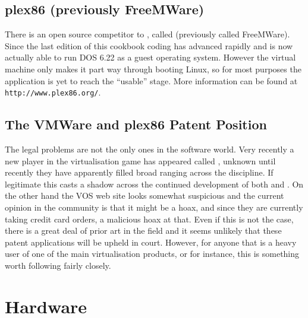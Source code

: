 \documentclass[twoside,11pt]{starlink}
\begin{document}
\subsection{plex86 (previously
FreeMWare)\label{sc15_freemware}}

There is an open source competitor to ,
called  (previously
called FreeMWare). Since the last edition of this cookbook coding has
advanced rapidly and is now actually able to run DOS 6.22 as a guest
operating system. However the virtual machine only makes it part way
through booting Linux, so for most purposes the application is yet to
reach the ``usable'' stage. More information can be found at
\texttt{http://www.plex86.org/}.


\subsection{The VMWare and plex86 Patent Position}

The  legal problems are not the only ones
in the software world. Very recently a new player in the
virtualisation game has appeared called
, unknown until
recently they have apparently filled broad ranging
 across the
discipline. If legitimate this casts a shadow across the continued
development of both 
and . On the other
hand the VOS web site looks somewhat suspicious and the current
opinion in the community is that it might be a hoax, and since they
are currently taking credit card orders, a malicious hoax at that.
Even if this is not the case, there is a great deal of prior art in
the field and it seems unlikely that these patent applications will be
upheld in court. However, for anyone that is a heavy user of one of
the main virtualisation products,
 or
 for instance, this is
something worth following fairly closely.

\section{Hardware\label{sc15_hardware}}
\end{document}
